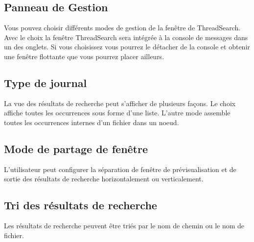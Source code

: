 \subsection{Panneau de Gestion}

Vous pouvez choisir différents modes de gestion de la fenêtre de ThreadSearch. Avec le choix  la fenêtre ThreadSearch sera intégrée à la console de messages dans un des onglets. Si vous choisissez  vous pourrez le détacher de la console et obtenir une fenêtre flottante que vous pourrez placer ailleurs.

\subsection{Type de journal}

La vue des résultats de recherche peut s'afficher de plusieurs façons. Le choix  affiche toutes les occurrences sous forme d'une liste. L'autre mode  assemble toutes les occurrences internes d'un fichier dans un noeud.

\subsection{Mode de partage de fenêtre}

L'utilisateur peut configurer la séparation de fenêtre de prévisualisation et de sortie des résultats de recherche horizontalement ou verticalement.

\subsection{Tri des résultats de recherche}

Les résultats de recherche peuvent être triés par le nom de chemin ou le nom de fichier.
